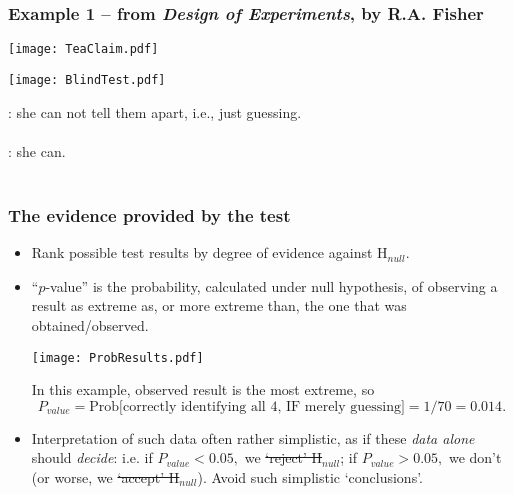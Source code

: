 \documentclass[10pt,handout]{beamer}\usepackage[]{graphicx}\usepackage[]{color}
\begin{document}
\begin{frame}
	
	\frametitle{Example 1 -- from \textit{Design of Experiments}, by R.A. Fisher}
	
	\parindent 128pt
	\texttt{[image: TeaClaim.pdf]}
	\parindent 0pt
	
	\begin{center}
		\texttt{[image: BlindTest.pdf]}
	\end{center}
	: she can not tell them apart, i.e., just guessing. \\ \ \\
	: she can. \\ \ \\ \pause
	
	
	
\end{frame}

\begin{frame}
	\frametitle{The evidence provided by the test}
	
	\begin{footnotesize}
		\begin{itemize}
			\item
			Rank possible test
			results by  degree of evidence against H$_{null}$. 
			\item ``$p$-value'' is the probability, calculated under null hypothesis, of
			observing a result as  extreme as, or more extreme than, the one that was obtained/observed.
			\begin{center}
				\texttt{[image: ProbResults.pdf]}
			\end{center}
			\pause
			In this example, observed result is the most extreme, so
			$$P_{value}=\textrm{Prob[correctly identifying all 4, IF merely guessing]} = 1/70 = 0.014.$$ \pause
			\item
			Interpretation of such data  often  rather simplistic, as if these \textit{data alone} should \textit{decide}:  i.e. if $P_{value} < 0.05,$ we \sout{`reject' H}$_{null}$; if $P_{value} > 0.05,$ we don't (or worse, we \sout{`accept' H}$_{null}$). Avoid such simplistic `conclusions'.
			
		\end{itemize}
	\end{footnotesize}
\end{frame}
\end{document}
